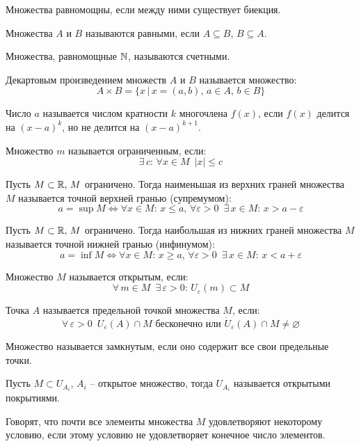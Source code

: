 \documentclass[12pt]{article}
\begin{document}
\begin{definition}
    Множества равномощны, если между ними существует биекция.
\end{definition}
\begin{definition}
    Множества $A$ и $B$ называются равными, если $A\subseteq B,\,B\subseteq A.$
\end{definition}
\begin{definition}
    Множества, равномощные $\mathbb{N}$, называются счетными.
\end{definition}
\begin{definition}
    Декартовым произведением множеств $A$ и $B$ называется множество:
    $$A\times B=\{x\,|\,x=(a,b),\,a\in A,\,b\in B\}$$
\end{definition}
\begin{definition}
    Число $a$ называется числом кратности $k$ многочлена $f(x)$, если $f(x)$ делится на $(x-a)^k$, но не делится на $(x-a)^{k+1}$.
\end{definition}
\begin{definition}
    Множество $m$ называется ограниченным, если:
    $$\exists\, c:\,\forall x\in M\enspace |x| \leq c$$
\end{definition}
\begin{definition}
    Пусть $M \subset \mathbb{R},\,M$ ограничено. Тогда наименьшая из верхних граней множества $M$ называется точной верхней гранью (супремумом):
    $$a=\sup M\Longleftrightarrow \forall x \in M:\, x \leq a,\, \forall \varepsilon>0\enspace \exists\, x \in M:\, x>a-\varepsilon$$
\end{definition}
\begin{definition}
    Пусть $M \subset \mathbb{R},\,M$ ограничено. Тогда наибольшая из нижних граней множества $M$ называется точной нижней гранью (инфинумом):
    $$a=\inf M\Longleftrightarrow \forall x \in M:\, x \geq a,\, \forall \varepsilon>0\enspace \exists\, x \in M:\, x<a+\varepsilon$$
\end{definition}
\begin{definition}
    Множество $M$ называется открытым, если:
    $$\forall\,m\in M\enspace\exists\,\varepsilon>0:\,U_\varepsilon(m)\subset M$$
\end{definition}
\begin{definition}
    Точка $A$ называется предельной точкой множества $M$, если:
    $$\forall\,\varepsilon>0\enspace U_\varepsilon(A)\cap M\text{ бесконечно или } \mathring{U}_\varepsilon(A)\cap M\neq \varnothing$$
\end{definition}
\begin{definition}
    Множество называется замкнутым, если оно содержит все свои предельные точки.
\end{definition}
\begin{definition}
    Пусть $M\subset U_{A_i}$, $A_i$ -- открытое множество, тогда $U_{A_i}$ называется открытыми покрытиями.
\end{definition}
\begin{definition}
    Говорят, что почти все элементы множества $M$ удовлетворяют некоторому условию, если этому условию не удовлетворяет конечное число элементов.
\end{definition}
\end{document}
